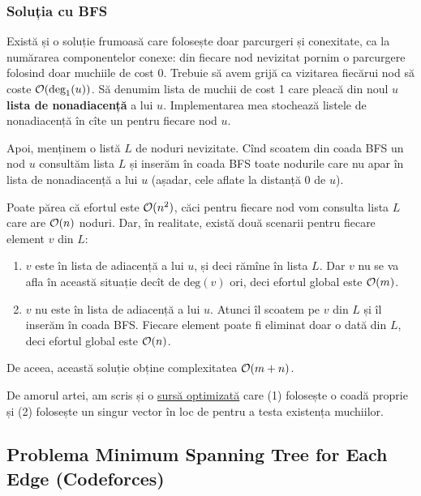 \documentclass[../main.tex]{subfiles}
\begin{document}
\subsubsection*{Soluția cu BFS}

Există și o soluție frumoasă care folosește doar parcurgeri și conexitate, ca la numărarea componentelor conexe: din fiecare nod nevizitat pornim o parcurgere folosind doar muchiile de cost 0. Trebuie să avem grijă ca vizitarea fiecărui nod să coste $\mathcal{O}(\text{deg}_1(u))$. Să denumim lista de muchii de cost 1 care pleacă din noul $u$ \textbf{lista de nonadiacență} a lui $u$. Implementarea mea stochează listele de nonadiacență în cîte un  pentru fiecare nod $u$.

Apoi, menținem o listă $L$ de noduri nevizitate. Cînd scoatem din coada BFS un nod $u$ consultăm lista $L$ și inserăm în coada BFS toate nodurile care nu apar în lista de nonadiacență a lui $u$ (așadar, cele aflate la distanță 0 de $u$).

Poate părea că efortul este $\mathcal{O}(n^2)$, căci pentru fiecare nod vom consulta lista $L$ care are $\mathcal{O}(n)$ noduri. Dar, în realitate, există două scenarii pentru fiecare element $v$ din $L$:

\begin{enumerate}
  \item $v$ este în lista de adiacență a lui $u$, și deci rămîne în lista $L$. Dar $v$ nu se va afla în această situație decît de $\text{deg}(v)$ ori, deci efortul global este $\mathcal{O}(m)$.

  \item $v$ nu este în lista de adiacență a lui $u$. Atunci îl scoatem pe $v$ din $L$ și îl inserăm în coada BFS. Fiecare element poate fi eliminat doar o dată din $L$, deci efortul global este $\mathcal{O}(n)$.
\end{enumerate}

De aceea, această soluție obține complexitatea $\mathcal{O}(m + n)$.

De amorul artei, am scris și o \href{https://codeforces.com/contest/1242/submission/309974379}{sursă optimizată} care (1) folosește o coadă proprie și (2) folosește un singur vector în loc de  pentru a testa existența muchiilor.

\subsection{Problema Minimum Spanning Tree for Each Edge (Codeforces)}
\label{problem:mst-for-each-edge}
\end{document}
